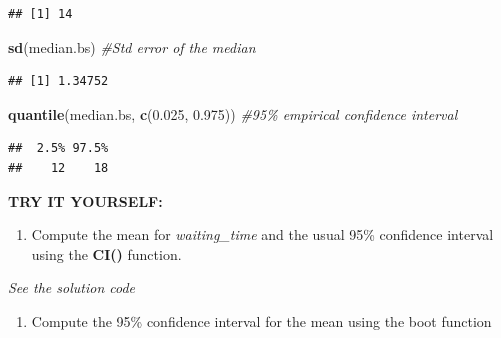 \documentclass[
]{book}
\newenvironment{Shaded}{\begin{snugshade}}{\end{snugshade}}
\newcommand{\CommentTok}[1]{\textcolor[rgb]{0.56,0.35,0.01}{\textit{#1}}}
\newcommand{\FloatTok}[1]{\textcolor[rgb]{0.00,0.00,0.81}{#1}}
\newcommand{\FunctionTok}[1]{\textcolor[rgb]{0.13,0.29,0.53}{\textbf{#1}}}
\newcommand{\NormalTok}[1]{#1}
\newcommand{\SpecialCharTok}[1]{\textcolor[rgb]{0.81,0.36,0.00}{\textbf{#1}}}
\providecommand{\tightlist}{%
  \setlength{\itemsep}{0pt}\setlength{\parskip}{0pt}}
\begin{document}
\begin{verbatim}
## [1] 14
\end{verbatim}

\begin{Shaded}
\begin{Highlighting}[]
\FunctionTok{sd}\NormalTok{(median.bs)      }\CommentTok{\#Std error of the median}
\end{Highlighting}
\end{Shaded}

\begin{verbatim}
## [1] 1.34752
\end{verbatim}

\begin{Shaded}
\begin{Highlighting}[]
\FunctionTok{quantile}\NormalTok{(median.bs, }\FunctionTok{c}\NormalTok{(}\FloatTok{0.025}\NormalTok{, }\FloatTok{0.975}\NormalTok{))  }\CommentTok{\#95\% empirical confidence interval}
\end{Highlighting}
\end{Shaded}

\begin{verbatim}
##  2.5% 97.5% 
##    12    18
\end{verbatim}

\textbf{TRY IT YOURSELF:}

\begin{enumerate}
\def\labelenumi{\arabic{enumi})}
\tightlist
\item
  Compute the mean for \emph{waiting\_time} and the usual 95\% confidence
  interval using the \textbf{CI()} function.
\end{enumerate}

\emph{See the solution code}

\begin{Shaded}
\end{Shaded}

\begin{enumerate}
\def\labelenumi{\arabic{enumi})}
\setcounter{enumi}{1}
\tightlist
\item
  Compute the 95\% confidence interval for the mean using the boot function
\end{enumerate}
\end{document}
